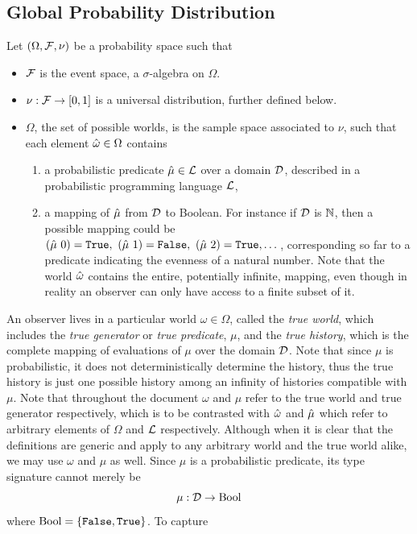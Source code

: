 \documentclass[]{article}
\begin{document}
\subsection{Global Probability Distribution}
\label{sec:globalprob}
Let $(\Omega, \mathcal{F}, \nu)$ be a probability space such that
\begin{itemize}
\item $\mathcal{F}$ is the event space, a $\sigma$-algebra on $\Omega$.
\item $\nu : \mathcal{F} \to [0, 1]$ is a universal distribution, further
  defined below.
\item $\Omega$, the set of possible worlds, is the sample space
  associated to $\nu$, such that each element $\hat{\omega} \in \Omega$
  contains
  \begin{enumerate}
  \item a probabilistic predicate $\hat{\mu} \in \mathcal{L}$ over a domain
    $\mathcal{D}$, described in a probabilistic programming language
    $\mathcal{L}$,
  \item a mapping of $\hat{\mu}$ from $\mathcal{D}$ to Boolean.  For instance
    if $\mathcal{D}$ is $\mathbb{N}$, then a possible mapping could be
    $(\anymu\ 0) = \True,\ (\anymu\ 1) = \False, \ (\anymu\ 2) =
    \True, \dots$, corresponding so far to a predicate indicating the
    evenness of a natural number.  Note that the world $\hat{\omega}$
    contains the entire, potentially infinite, mapping, even though in
    reality an observer can only have access to a finite subset of it.
  \end{enumerate}
\end{itemize}
An observer lives in a particular world $\omega \in \Omega$, called
the \emph{true world}, which includes the \emph{true generator} or
\emph{true predicate}, $\mu$, and the \emph{true history}, which is
the complete mapping of evaluations of $\mu$ over the domain
$\mathcal{D}$.  Note that since $\mu$ is probabilistic, it does not
deterministically determine the history, thus the true history is just
one possible history among an infinity of histories compatible with
$\mu$.  Note that throughout the document $\omega$ and $\mu$ refer to
the true world and true generator respectively, which is to be
contrasted with $\hat{\omega}$ and $\hat{\mu}$ which refer to arbitrary
elements of $\Omega$ and $\mathcal{L}$ respectively.  Although when it
is clear that the definitions are generic and apply to any arbitrary
world and the true world alike, we may use $\omega$ and $\mu$ as well.
Since $\mu$ is a probabilistic predicate, its type signature cannot
merely be
$$\mu : \mathcal{D} \to \textup{Bool}$$ where $\textup{Bool} = \{\texttt{False}, \texttt{True}\}$.  To capture
\end{document}

